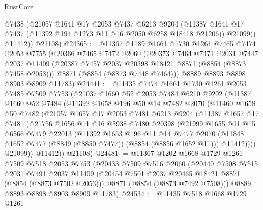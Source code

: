\begin{lexlean}{RustCore}
\begin{coremodule}
            @7438
            (@21057
              @1641
              @17
              @2053
              @7437
              @6213
              @9204
              (@11387 @1641 @17 @7437 (@11392 @194 @1273 @11 @16 @2050 @6258 @18418 @21206))
              @21099))
          @11412))
      @21108)
@24365 := @11367
    @1189
    @1661
    @1730
    @1261
    @7465
    @7474
    @2053
    @7755
    (@20366
      @7465
      @7472
      @2060
      (@20373
        @7464
        @7471
        @2031
        @7447
        @2037
        @11409
        (@20387 @7457 @2037 @20398 @18421 @8871 (@8854 (@8873 @7458 @2053)))
        @8871
        (@8854 (@8873 @7448 @7464)))
      @8889
      @8893
      @8898
      @8903
      @8909
      @11783)
@24441 := @11435
    @7474
    @1661
    @1730
    @1261
    @2053
    @7485
    @7509
    @7753
    (@21037
      @1660
      @52
      @2053
      @7484
      @6210
      @9202
      (@11387
        @1660
        @52
        @7484
        (@11392
          @1658
          @196
          @50
          @14
          @7482
          @2070
          (@11460
            @1658
            @50
            @7482
            (@21057
              @1657
              @17
              @2053
              @7481
              @6213
              @9204
              (@11387
                @1657
                @17
                @7481
                (@21756
                  @1656
                  @11
                  @16
                  @5938
                  @7480
                  @20398
                  (@21999
                    @1655
                    @11
                    @15
                    @6566
                    @7479
                    @22013
                    (@11392
                      @1653
                      @196
                      @11
                      @14
                      @7477
                      @2070
                      (@11848 @1652 @7477 (@8849 (@8850 @7477)) (@8854 (@8856 @1652 @11)))
                      @11412))))
              @21099))
          @11412))
      @21108)
@24481 := @11367
    @1202
    @1668
    @1729
    @1261
    @7509
    @7518
    @2053
    @7753
    (@20433
      @7509
      @7516
      @2060
      (@20440
        @7508
        @7515
        @2031
        @7491
        @2037
        @11409
        (@20454 @7501 @2037 @20465 @18421 @8871 (@8854 (@8873 @7502 @2053)))
        @8871
        (@8854 (@8873 @7492 @7508)))
      @8889
      @8893
      @8898
      @8903
      @8909
      @11783)
@24534 := @11435
    @7518
    @1668
    @1729
    @1261

\end{coremodule}
\end{lexlean}
